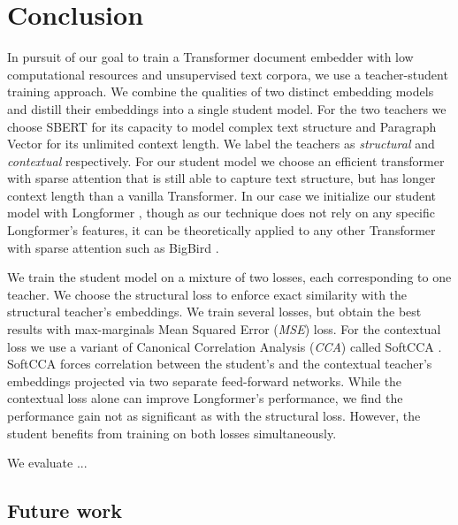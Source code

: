 \chapter*{Conclusion}

In pursuit of our goal to train a Transformer document embedder with low
computational resources and unsupervised text corpora, we use a teacher-student
training approach. We combine the qualities of two distinct embedding models
and distill their embeddings into a single student model. For the two teachers
we choose SBERT \citep{reimers2019sentence} for its capacity to model complex
text structure and Paragraph Vector \citep{le2014distributed} for its
unlimited context length. We label the teachers as \emph{structural} and
\emph{contextual} respectively. For our student model we choose an efficient
transformer with sparse attention that is still able to capture text structure,
but has longer context length than a vanilla Transformer. In our case we
initialize our student model with Longformer \citep{beltagy2020longformer},
though as our technique does not rely on any specific Longformer's features, it
can be theoretically applied to any other Transformer with sparse attention
such as BigBird \citep{zaheer2020big}.

We train the student model on a mixture of two losses, each corresponding to
one teacher. We choose the structural loss to enforce exact similarity with the
structural teacher's embeddings. We train several losses, but obtain the best
results with max-marginals Mean Squared Error (\emph{MSE}) loss. For the
contextual loss we use a variant of Canonical Correlation Analysis (\emph{CCA})
\citep{hotelling1992relations} called SoftCCA \citep{chen2016training}. SoftCCA
forces correlation between the student's and the contextual teacher's
embeddings projected via two separate feed-forward networks. While the
contextual loss alone can improve Longformer's performance, we find the
performance gain not as significant as with the structural loss. However, the
student benefits from training on both losses simultaneously.

We evaluate ...




\section{Future work}

